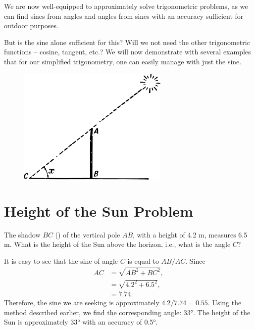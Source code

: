 We are now well-equipped to approximately solve trigonometric problems, as we can find sines from angles and angles from sines with an accuracy sufficient for outdoor purposes.

But is the sine alone sufficient for this? Will we not need the other trigonometric functions -- cosine, tangent, etc.? We will now demonstrate with several examples that for our simplified trigonometry, one can easily manage with just the sine.


\begin{figure}%
\centering
\includegraphics[width=0.65\textwidth]{figures/ch-05/fig-092.pdf}
\end{figure}


\section{Height of the Sun Problem}
\label{sec-5.4}

\ques The shadow $BC$ () of the vertical pole $AB$, with a height of 4.2 m, measures 6.5 m. What is the height of the Sun above the horizon, i.e., what is the angle $C$?


\ans It is easy to see that the sine of angle $C$ is equal to $AB/AC$. Since 
\begin{align*}%
AC & = \sqrt{AB^{2} + BC^{2}},\\
& = \sqrt{4.2^{2} + 6.5^{2}},\\ 
& = 7.74. 
\end{align*}
Therefore, the sine we are seeking is approximately $4.2/7.74 = 0.55$. Using the method described earlier, we find the corresponding angle: \ang{33}. The height of the Sun is approximately \ang{33} with an accuracy of \ang{0.5}.

